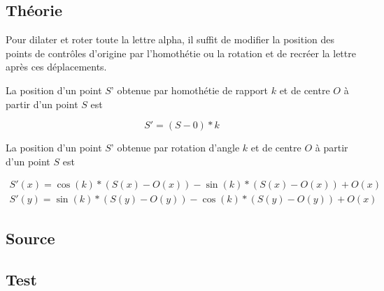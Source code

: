\documentclass[a4paper,10pt]{report}
\begin{document}
\subsection*{Théorie}

Pour dilater et roter toute la lettre alpha, il suffit de modifier la position des points de contrôles d’origine par l’homothétie ou la rotation et de recréer la lettre après ces déplacements.

La position d’un point $S’$ obtenue par homothétie de rapport $k$ et de centre $O$ à partir d’un point $S$ est 

\begin{equation}
	S' = (S - 0) * k
\end{equation}

La position d’un point $S’$ obtenue par rotation d’angle $k$ et de centre $O$ à partir d’un point $S$ est 

\begin{equation}
	\begin{array}{ll}
		S'(x) = \cos(k) * (S(x)-O(x)) - \sin(k) * (S(x) - O(x))+O(x)\\
		S'(y) = \sin(k) * (S(y)-O(y)) - \cos(k) * (S(y) - O(y))+O(x)
	\end{array}
\end{equation}


\subsection*{Source}

\begin{center}
	
\end{center}

\begin{center}
	
\end{center}

\subsection*{Test}
\end{document}
